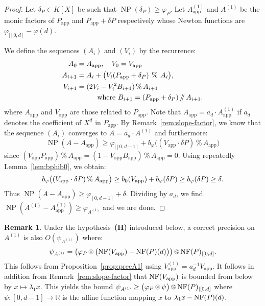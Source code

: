 \documentclass{sig-alternate-05-2015}
\DeclareMathOperator{\NP}{NP}
\newcommand{\R}{\mathbb R}
\newcommand{\NF}{\text{\rm NF}}
\renewcommand{\mod}{\,\%\,}
\renewcommand{\div}{\,/\hspace{-0.3em}/\,}
\newcommand{\nfop}[1]{%
\raisebox{-0.1mm}{\begin{tikzpicture}
\draw[transparent] (-0.18,0)--(0.18,0);
\draw[very thin] (0,0) circle (0.11cm);
\begin{scope}
\clip (0,0) circle (0.11cm);
\node[scale=0.75] at (0,0) { $#1$ };
\end{scope}
\end{tikzpicture}}}
\newcommand{\nftimes}{\nfop\times}
\newcommand{\nfmod}{\nfop\mod}
\newcommand{\app}{\textrm{app}}
\theoremstyle{definition}
\newtheorem{rem}[theo]{Remark}
\begin{document}
\begin{proof}
Let $\delta_P \in K[X]$ be such that $\NP(\delta_P) \geq \varphi_P$.
Let $A_\app^{(1)}$ and $A^{(1)}$ be the monic factors of $P_\app$
and $P_\app + \delta P$ respectively whose Newton functions are
$\varphi_{|[0,d]} - \varphi(d)$.

We define the sequences $(A_i)$ and $(V_i)$ by the recurrence: 
\begin{align*} 
A_0 & = A_\app, \quad V_{0} = V_\app \medskip \\ A_{i+1} 
&= A_i + \big(V_i (P_\app + \delta_P) \:\mod\: A_i\big), \smallskip \\ 
V_{i+1} &= (2 V_i -V_i^2 B_{i+1} ) \mod A_{i+1} \\ 
&  \hspace{1cm}\text{where } B_{i+1} = (P_\app + \delta_P) \div A_{i+1}. 
\end{align*} 
where $A_\app$ and $V_\app$ are those related to $P_\app$. Note that 
$A_\app = a_d \cdot A^{(1)}_\app$ if $a_d$ denotes the coefficient of 
$X^d$ in $P_\app$. By Remark~\ref{rem:slope-factor}, we know that the 
sequence $(A_i)$ converges to $A = a_d \cdot A^{(1)}$ and furthermore:
$$\NP(A - A_\app) \geq \varphi_{|[0,d{-}1]} + 
b_\varphi\big((V_\app \cdot \delta P) \mod A_\app\big)$$ 
since $(V_\app P_\app) \mod A_\app = (1 - V_\app B_\app) \mod A_\app = 
0$. Using repeatedly Lemma~\ref{lem:bphib0}, we obtain:
$$b_\varphi\big((V_\app \cdot \delta P) \mod A_\app\big)
  \geq b_0(V_\app) + b_\varphi(\delta P) \\
  \geq b_\varphi(\delta P) \geq \delta.$$
Thus $\NP(A - A_\app) \geq \varphi_{[0,d{-}1]} + \delta$. Dividing
by $a_d$, we find
$\NP(A^{(1)} - A^{(1)}_\app) \geq \varphi_{A^{(1)}}$ and we are done.
\end{proof}

\begin{rem}
Under the hypothesis~\textbf{(H)} introduced below, a correct precision 
on $A^{(1)}$ is also $O(\psi_{A^{(1)}})$ where:
$$\psi_{A^{(1)}} = \big(\varphi_P \nftimes \big(\NF(V_\app)
- \NF(P)(d)\big)\big) \nfmod \NF(P)_{|[0,d]}.$$
This follows from Proposition~\ref{prop:precA1} using
$V^{(1)}_\app = a_d^{-1} V_\app$. It follows in addition from 
Remark~\ref{rem:slope-factor} that $\NF(V_\app)$ is bounded from below 
by $x \mapsto \lambda_1 x$. This yields the bound
$\psi_{A^{(1)}} \geq \big(\varphi_P \nftimes \psi\big) \nfmod 
\NF(P)_{|[0,d]}$
where $\psi : [0,d{-}1] \to \R$ is the affine function mapping $x$
to $\lambda_1 x - \NF(P)(d)$. 
\end{rem}
\end{document}
